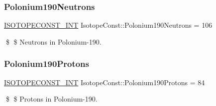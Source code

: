 \subsubsection{\texorpdfstring{Polonium190\+Neutrons}{Polonium190Neutrons}}
{\footnotesize\ttfamily \mbox{\hyperlink{group___isotope_const-_macros_ga5f18360b3e99483a35c32d789e62621c}{I\+S\+O\+T\+O\+P\+E\+C\+O\+N\+S\+T\+\_\+\+I\+NT}} Isotope\+Const\+::\+Polonium190\+Neutrons = 106}

\$ \$ Neutrons in Polonium-\/190. \mbox{\label{group___isotope_const-_polonium-_po190_ga231c606515cd9fb6805a72f1beb53257}} 
\subsubsection{\texorpdfstring{Polonium190\+Protons}{Polonium190Protons}}
{\footnotesize\ttfamily \mbox{\hyperlink{group___isotope_const-_macros_ga5f18360b3e99483a35c32d789e62621c}{I\+S\+O\+T\+O\+P\+E\+C\+O\+N\+S\+T\+\_\+\+I\+NT}} Isotope\+Const\+::\+Polonium190\+Protons = 84}

\$ \$ Protons in Polonium-\/190. 